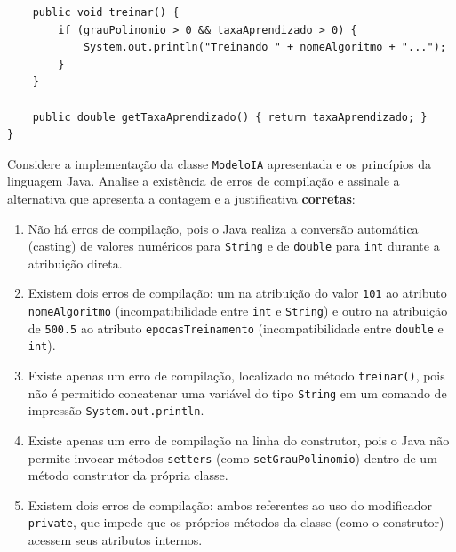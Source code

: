 \documentclass[12pt,a4paper]{article}
\begin{document}
\begin{enumerate}
\begin{lstlisting}
    public void treinar() {
        if (grauPolinomio > 0 && taxaAprendizado > 0) {
            System.out.println("Treinando " + nomeAlgoritmo + "...");
        }
    }

    public double getTaxaAprendizado() { return taxaAprendizado; }
}
\end{lstlisting}

Considere a implementação da classe \texttt{ModeloIA} apresentada e os princípios da linguagem Java. Analise a existência de erros de compilação e assinale a alternativa que apresenta a contagem e a justificativa \textbf{corretas}:

\begin{enumerate}[label=\Alph*)]
    \item Não há erros de compilação, pois o Java realiza a conversão automática (casting) de valores numéricos para \texttt{String} e de \texttt{double} para \texttt{int} durante a atribuição direta.
    \item Existem dois erros de compilação: um na atribuição do valor \texttt{101} ao atributo \texttt{nomeAlgoritmo} (incompatibilidade entre \texttt{int} e \texttt{String}) e outro na atribuição de \texttt{500.5} ao atributo \texttt{epocasTreinamento} (incompatibilidade entre \texttt{double} e \texttt{int}).
    \item Existe apenas um erro de compilação, localizado no método \texttt{treinar()}, pois não é permitido concatenar uma variável do tipo \texttt{String} em um comando de impressão \texttt{System.out.println}.
    \item Existe apenas um erro de compilação na linha do construtor, pois o Java não permite invocar métodos \texttt{setters} (como \texttt{setGrauPolinomio}) dentro de um método construtor da própria classe.
    \item Existem dois erros de compilação: ambos referentes ao uso do modificador \texttt{private}, que impede que os próprios métodos da classe (como o construtor) acessem seus atributos internos.
\end{enumerate}










\end{enumerate}
\end{document}
